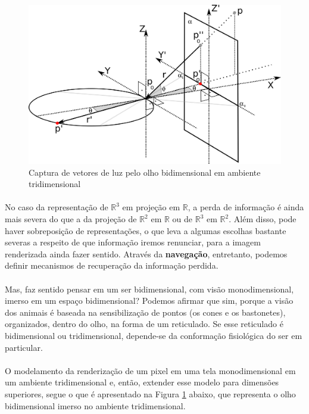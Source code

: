 \documentclass{article}
\newcommand\R{\mathbb{R}}
\begin{document}
	\begin{figure}
		\centering
		\includegraphics[scale=0.6]{Olho-Bidi-Detalhe}
		\caption{Captura de vetores de luz pelo olho bidimensional em ambiente tridimensional}
		\label{fig:olho-bidi}
	\end{figure}

	\paragraph{}
	No caso da representação de $\R^3$ em projeção em $\R$, a perda de informação é ainda mais severa do que a da projeção de $\R^2$ em $\R$ ou de $\R^3$ em $\R^2$. Além disso, pode haver sobreposição de representações, o que leva a algumas escolhas bastante severas a respeito de que informação iremos renunciar, para a imagem renderizada ainda fazer sentido. Através da \textbf{navegação}, entretanto, podemos definir mecanismos de recuperação da informação perdida.
	
	\paragraph{}
	Mas, faz sentido pensar em um ser bidimensional, com visão monodimensional, imerso em um espaço bidimensional? Podemos afirmar que sim, porque a visão dos animais é baseada na sensibilização de pontos (os cones e os bastonetes), organizados, dentro do olho, na forma de um reticulado. Se esse reticulado é bidimensional ou tridimensional, depende-se da conformação fisiológica do ser em particular.

	\paragraph{}
	O modelamento da renderização de um pixel em uma tela monodimensional em um ambiente tridimensional e, então, extender esse modelo para dimensões superiores, segue o que é apresentado na Figura \ref{fig:olho-bidi} abaixo, que representa o olho bidimensional imerso no ambiente tridimensional.
	
\end{document}
